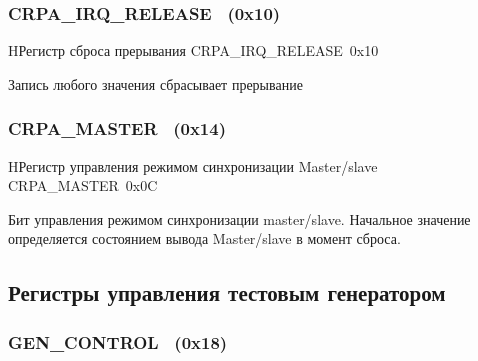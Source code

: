 \subsubsection{CRPA\_IRQ\_RELEASE~ (0x10)}
\renewcommand{\regnam}{CRPA\_IRQ\_RELEASE~}
\label{sec:CRPA_IRQ_RELEASE}

\begin{register}{H}{Регистр сброса прерывания \regnam}{0x10}
\label{regsamplecount}%
%
\regnewline%

\begin{regdesc}\begin{reglist}
\item [Reserved (rw)]
Запись любого значения сбрасывает прерывание
\end{reglist}\end{regdesc}
\end{register}

\subsubsection{CRPA\_MASTER~ (0x14)}
\renewcommand{\regnam}{CRPA\_MASTER~}
\label{sec:CRPA_MASTER}

\begin{register}{H}{Регистр управления режимом синхронизации Master/slave \regnam}{0x0C}
\label{regsamplecount}%
%
%
\regnewline%

\begin{regdesc}\begin{reglist}
\item [CRPA\_MASTER (rw)]
Бит управления режимом синхронизации master/slave. Начальное значение определяется
состоянием вывода Master/slave в момент сброса.
\end{reglist}\end{regdesc}
\end{register}

\subsection{Регистры управления тестовым генератором}

\subsubsection{GEN\_CONTROL~ (0x18)}
\renewcommand{\regnam}{GEN\_CONTROL~}
\label{sec:GEN_CONTROL}

